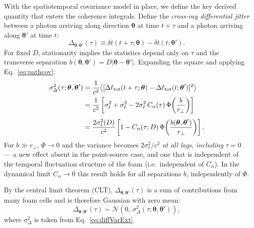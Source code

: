 \documentclass[aps,prd,onecolumn,amsmath,amssymb]{revtex4-2}
\begin{document}
With the spatiotemporal covariance model in place, we define the key derived quantity
that enters the coherence integrals.
Define the \emph{cross-ray differential jitter} between a photon arriving along
direction $\boldsymbol{\theta}$ at time $t+\tau$ and a photon arriving along
$\boldsymbol{\theta}'$ at time $t$:
\begin{equation}
  \Delta_{\boldsymbol{\theta},\boldsymbol{\theta}'}(\tau)
  \equiv \delta t(t+\tau;\boldsymbol{\theta}) - \delta t(t;\boldsymbol{\theta}').
  \label{eq:DeltaExt}
\end{equation}
For fixed $D$, stationarity implies the statistics depend only on $\tau$ and the
transverse separation $b(\boldsymbol{\theta},\boldsymbol{\theta}')=D|\boldsymbol{\theta}-\boldsymbol{\theta}'|$.
Expanding the square and applying Eq.~\eqref{eq:pathcov}:
\begin{align}
  \sigma_\Delta^2(\tau;\boldsymbol{\theta},\boldsymbol{\theta}')
  &= \frac{1}{c^2}\big\langle
    [\Delta\ell_{\rm tot}(t+\tau;\boldsymbol{\theta})
     - \Delta\ell_{\rm tot}(t;\boldsymbol{\theta}')]^2
    \big\rangle \notag \\
  &= \frac{1}{c^2}\left[
    \sigma_\ell^2 + \sigma_\ell^2
    - 2\sigma_\ell^2\,C_\alpha(\tau)\,\Phi\!\left(\frac{b}{r_\perp}\right)
    \right] \notag \\[4pt]
  &= \frac{2\sigma_\ell^2(D)}{c^2}
    \left[1 - C_\alpha(\tau;D)\,\Phi\!\left(\frac{b(\boldsymbol{\theta},\boldsymbol{\theta}')}{r_\perp}\right)\right].
  \label{eq:diffVarExt}
\end{align}
For $b\gg r_\perp$, $\Phi\to 0$ and the variance becomes
$2\sigma_\ell^2/c^2$ \emph{at all lags, including $\tau=0$} — a new effect
absent in the point-source case, and one that is independent of the temporal
fluctuation structure of the foam (i.e.\ independent of $C_\alpha$).
In the dynamical limit $C_\alpha\to 0$ this result holds for all separations
$b$, independently of $\Phi$.

By the central limit theorem (CLT), $\Delta_{\boldsymbol{\theta},\boldsymbol{\theta}'}(\tau)$
is a sum of contributions from many foam cells and is therefore Gaussian with zero mean: 
\begin{equation}
  \Delta_{\boldsymbol{\theta},\boldsymbol{\theta}'}(\tau)
  \sim \mathcal{N}\!\left(0,\,\sigma_\Delta^2(\tau;\boldsymbol{\theta},\boldsymbol{\theta}')\right),
  \label{eq:kernel}
\end{equation}
where $\sigma_\Delta^2$ is taken from Eq.~\eqref{eq:diffVarExt}.
\end{document}

